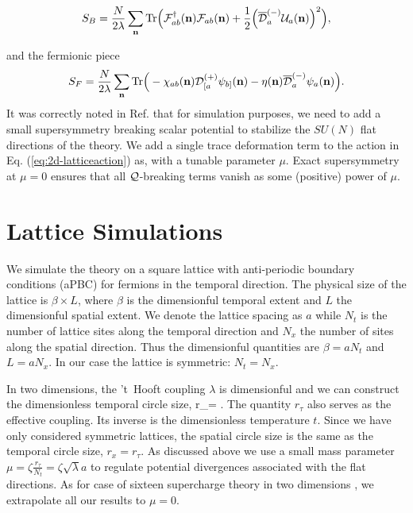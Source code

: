 \begin{equation}
S_{B} = \frac{N}{2 \lambda} \sum_{\mathbf{n}} \mathrm{Tr} \Big( {\cal F}_{ab}^\dagger(\mathbf{n}) {\cal F}_{ab}(\mathbf{n}) + \frac{1}{2} \Big({\overline{\cal D}}_a^{(-)} \mathcal U_a(\mathbf{n})\Big)^2\Big), \nonumber 
\end{equation}

and the fermionic piece
\begin{equation}
S_F = \frac{N}{2 \lambda} \sum_{\mathbf{n}} \mathrm{Tr} \Big( - \chi_{ab}(\mathbf{n}) \mathcal D^{(+)}_{[a} \psi_{b]}(\mathbf{n}) - \eta(\mathbf{n}) {\overline{\cal D}}^{(-)}_a \psi_a(\mathbf{n}) \Big). \nonumber 
\end{equation}
It was correctly noted in Ref. \cite{Kanamori:2008bk} that for simulation purposes, we need to add a small supersymmetry breaking scalar potential to stabilize the $SU(N)$ flat directions of the theory. We add a single trace deformation term to the action in Eq. (\ref{eq:2d-latticeaction}) as, 
with a tunable parameter $\mu$. Exact supersymmetry at $\mu = 0$ ensures that all $\mathcal Q$-breaking terms vanish as some (positive) power of $\mu$.

\section{Lattice Simulations}
\label{sec:computation}

We simulate the theory on a square lattice with anti-periodic boundary conditions (aPBC) for fermions in the temporal direction. The physical size of the lattice is $\beta \times L$, where $\beta$ is the dimensionful temporal extent and $L$ the dimensionful spatial extent. We denote the lattice spacing as $a$ while $N_t$ is the number of lattice sites along the temporal direction and $N_x$ the number of sites along the spatial direction. Thus the dimensionful quantities are $\beta = a N_t$ and $L = a N_x$. In our case the lattice is symmetric: $N_t = N_x$. 

In two dimensions, the 't~Hooft coupling $\lambda$ is dimensionful and we can construct the dimensionless temporal circle size, 
\beq
r_\tau = \sqrt{\lambda} \beta.
\eeq
The quantity $r_\tau$ also serves as the effective coupling. Its inverse is the dimensionless temperature $t$. Since we have only considered symmetric lattices, the spatial circle size is the same as the temporal circle size, $r_x = r_\tau$. As discussed above we use a small mass parameter $\mu = \zeta \frac{r_\tau}{N_t} = \zeta \sqrt{\lambda} a$ to regulate potential divergences associated with the flat directions. As for case of sixteen supercharge theory in two dimensions \cite{Catterall:2017lub, Jha:2017zad}, we extrapolate all our results to $\mu = 0$.

